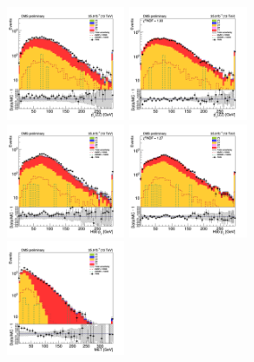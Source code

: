 \begin{figure}[tbp]
  \begin{center}
    \includegraphics[width=0.31\textwidth]{figures/mm_300_april18/hpt0_mm_CRDY_prefit_plot_apr18.png}
    \includegraphics[width=0.31\textwidth]{figures/mm_300_april18/hpt0_mm_CRDY_FullPostfit_plot_apr18.png}\\
    \includegraphics[width=0.31\textwidth]{figures/mm_300_april18/hpt1_mm_CRDY_prefit_plot_apr18.png}
    \includegraphics[width=0.31\textwidth]{figures/mm_300_april18/hpt1_mm_CRDY_FullPostfit_plot_apr18.png}\\
    \includegraphics[width=0.31\textwidth]{figures/mm_300_april18/met_pt_mm_CRDY_prefit_plot_apr18.png}

\end{center}
\end{figure}

